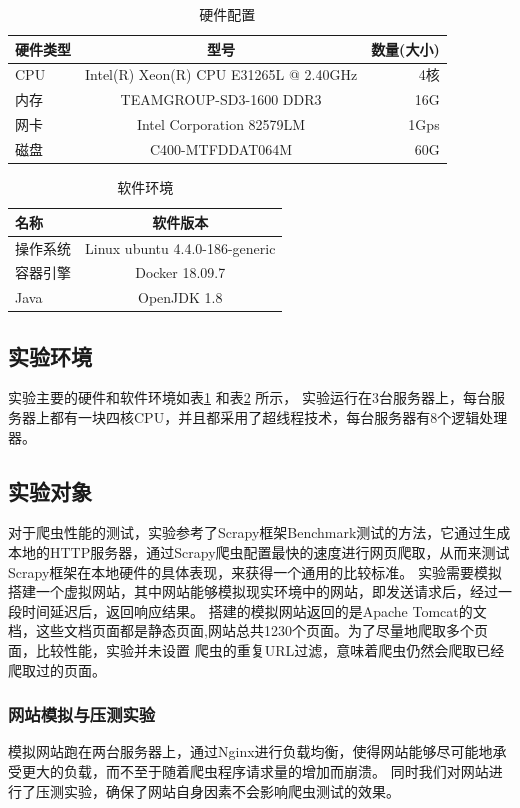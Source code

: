 \documentclass[master]{njuthesis}
\begin{document}
\begin{table}
\centering
\begin{tabular}{|l|c|r|}
\hline
硬件类型&型号&数量(大小) \\
\hline
CPU&Intel(R) Xeon(R) CPU E31265L @ 2.40GHz&4核 \\
内存& TEAMGROUP-SD3-1600 DDR3&16G \\
网卡& Intel Corporation 82579LM&1Gps \\
磁盘& C400-MTFDDAT064M & 60G \\
\hline
\end{tabular}
\caption{硬件配置}\label{hardware_config}
\end{table}

\begin{table}
\centering
\begin{tabular}{|l|c|}
\hline
名称 & 软件版本 \\
\hline
操作系统 & Linux ubuntu 4.4.0-186-generic \\
容器引擎 & Docker 18.09.7 \\
Java & OpenJDK 1.8 \\
\hline
\end{tabular}
\caption{软件环境}\label{software_config}
\end{table}

\subsection{实验环境}
实验主要的硬件和软件环境如表\ref{hardware_config} 和表\ref{software_config} 所示，
实验运行在3台服务器上，每台服务器上都有一块四核CPU，并且都采用了超线程技术，每台服务器有8个逻辑处理器。

\subsection{实验对象}
对于爬虫性能的测试，实验参考了Scrapy框架Benchmark测试的方法\cite{thalheim2004website}，它通过生成本地的HTTP服务器，通过Scrapy爬虫配置最快的速度进行网页爬取，从而来测试
Scrapy框架在本地硬件的具体表现，来获得一个通用的比较标准。
实验需要模拟搭建一个虚拟网站，其中网站能够模拟现实环境中的网站，即发送请求后，经过一段时间延迟后，返回响应结果。
搭建的模拟网站返回的是Apache Tomcat的文档，这些文档页面都是静态页面,网站总共1230个页面。为了尽量地爬取多个页面，比较性能，实验并未设置
爬虫的重复URL过滤，意味着爬虫仍然会爬取已经爬取过的页面。

\subsubsection{网站模拟与压测实验}
模拟网站跑在两台服务器上，通过Nginx进行负载均衡，使得网站能够尽可能地承受更大的负载，而不至于随着爬虫程序请求量的增加而崩溃。
同时我们对网站进行了压测实验，确保了网站自身因素不会影响爬虫测试的效果。
\end{document}
